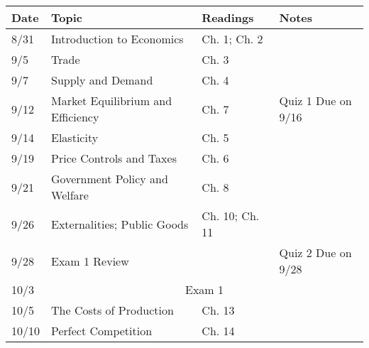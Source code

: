 \documentclass[11pt]{article}
\begin{document}
\begin{table}[h!]
	\centering
\begin{tabular}{@{}|l|l|l|l|@{}}
	\toprule
	\textbf{Date} & \textbf{Topic}                                                                           & \textbf{Readings}  & \textbf{Notes} \\ \midrule
	8/31          & Introduction to Economics                                                                & Ch. 1; Ch. 2              &            \\ \midrule
	9/5          & Trade                                                                                    & Ch. 3              &                \\ \midrule
	9/7          & Supply and Demand                                                                        & Ch. 4          &            \\ \midrule
	9/12          & Market Equilibrium and Efficiency                                                & Ch. 7              &  Quiz 1 Due on 9/16 \\ \midrule
	9/14          & Elasticity                                                                               & Ch. 5              &                \\ \midrule
	9/19          & Price Controls and Taxes                                                   & Ch. 6       &                \\ \midrule
	9/21          & Government Policy and Welfare                                        & Ch. 8       &                \\ \midrule
	9/26          & Externalities; Public Goods                                                           & Ch. 10; Ch. 11     &               \\ \midrule
	9/28          & Exam 1 Review                                                               &         & Quiz 2 Due on 9/28  \\ \midrule
	\rowcolor[HTML]{009901} 
	10/3          & \multicolumn{3}{c|}{\cellcolor[HTML]{009901}Exam 1}                                                                            \\ \midrule
	10/5          & The Costs of Production                                                                 & Ch. 13             &             \\ \midrule
	10/10          & Perfect Competition                                                                      & Ch. 14             &              \\ \midrule

\end{tabular}
\end{table}
\end{document}
